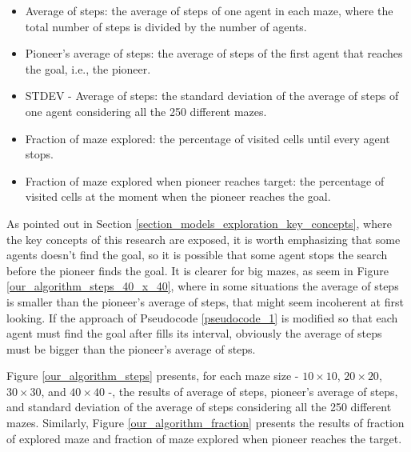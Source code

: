 \begin{itemize}
\item Average of steps: the average of steps of one agent in each maze, where the total number of steps is divided by the number of agents.

\item Pioneer's average of steps: the average of steps of the first agent that reaches the goal, i.e., the pioneer.

\item STDEV - Average of steps: the standard deviation of the average of steps of one agent considering all the 250 different mazes.

\item Fraction of maze explored: the percentage of visited cells until every agent stops.

\item Fraction of maze explored when pioneer reaches target: the percentage of visited cells at the moment when the pioneer reaches the goal.
\end{itemize}

As pointed out in Section \ref{section_models_exploration_key_concepts}, where the key concepts of this research are exposed, it is worth emphasizing that some agents doesn't find the goal, so it is possible that some agent stops the search before the pioneer finds the goal. It is clearer for big mazes, as seem in Figure \ref{our_algorithm_steps_40_x_40}, where in some situations the average of steps is smaller than the pioneer's average of steps, that might seem incoherent at first looking. If the approach of Pseudocode \ref{pseudocode_1} is modified so that each agent must find the goal after fills its interval, obviously the average of steps must be bigger than the pioneer's average of steps.

Figure \ref{our_algorithm_steps} presents, for each maze size - $10 \times 10$, $20 \times 20$, $30 \times 30$, and $40 \times 40$ -, the results of average of steps, pioneer's average of steps, and standard deviation of the average of steps considering all the 250 different mazes. Similarly, Figure \ref{our_algorithm_fraction} presents the results of fraction of explored maze and fraction of maze explored when pioneer reaches the target.

